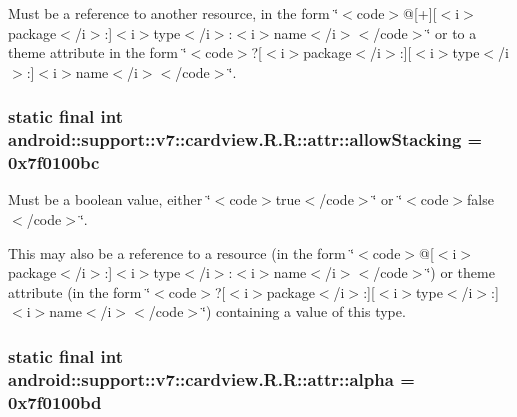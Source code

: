 Must be a reference to another resource, in the form \char`\"{}$<$code$>$@\mbox{[}+\mbox{]}\mbox{[}$<$i$>$package$<$/i$>$:\mbox{]}$<$i$>$type$<$/i$>$:$<$i$>$name$<$/i$>$$<$/code$>$\char`\"{} or to a theme attribute in the form \char`\"{}$<$code$>$?\mbox{[}$<$i$>$package$<$/i$>$:\mbox{]}\mbox{[}$<$i$>$type$<$/i$>$:\mbox{]}$<$i$>$name$<$/i$>$$<$/code$>$\char`\"{}. \hypertarget{classandroid_1_1support_1_1v7_1_1cardview_1_1_r_1_1attr_e9106c3afcc965ddb801ba553d6eaf5a}{
\subsubsection[{allowStacking}]{\setlength{\rightskip}{0pt plus 5cm}static final int android::support::v7::cardview.R.R::attr::allowStacking = 0x7f0100bc}}
\label{classandroid_1_1support_1_1v7_1_1cardview_1_1_r_1_1attr_e9106c3afcc965ddb801ba553d6eaf5a}


Must be a boolean value, either \char`\"{}$<$code$>$true$<$/code$>$\char`\"{} or \char`\"{}$<$code$>$false$<$/code$>$\char`\"{}. 

This may also be a reference to a resource (in the form \char`\"{}$<$code$>$@\mbox{[}$<$i$>$package$<$/i$>$:\mbox{]}$<$i$>$type$<$/i$>$:$<$i$>$name$<$/i$>$$<$/code$>$\char`\"{}) or theme attribute (in the form \char`\"{}$<$code$>$?\mbox{[}$<$i$>$package$<$/i$>$:\mbox{]}\mbox{[}$<$i$>$type$<$/i$>$:\mbox{]}$<$i$>$name$<$/i$>$$<$/code$>$\char`\"{}) containing a value of this type. \hypertarget{classandroid_1_1support_1_1v7_1_1cardview_1_1_r_1_1attr_48ab3c1bda4a04c31255bef187f19ab6}{
\subsubsection[{alpha}]{\setlength{\rightskip}{0pt plus 5cm}static final int android::support::v7::cardview.R.R::attr::alpha = 0x7f0100bd}}
\label{classandroid_1_1support_1_1v7_1_1cardview_1_1_r_1_1attr_48ab3c1bda4a04c31255bef187f19ab6}


